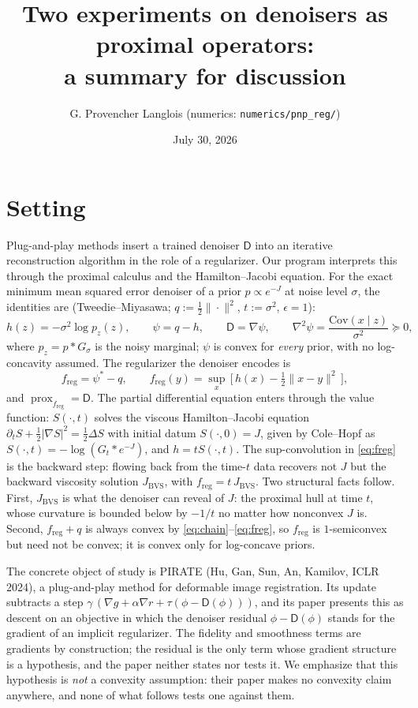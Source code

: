 \documentclass[11pt]{article}
\title{Two experiments on denoisers as proximal operators:\\ a summary for discussion}
\author{G. Provencher Langlois (numerics: \texttt{numerics/pnp\_reg/})}
\date{July 30, 2026}
\newcommand{\D}{\mathsf{D}}
\newcommand{\prox}{\operatorname{prox}}
\newcommand{\freg}{f_{\mathrm{reg}}}
\newcommand{\Jbvs}{J_{\mathrm{BVS}}}
\begin{document}
\maketitle

\section{Setting}

Plug-and-play methods insert a trained denoiser $\D$ into an iterative reconstruction algorithm in the role of a regularizer. Our program interprets this through the proximal calculus and the Hamilton--Jacobi equation. For the exact minimum mean squared error denoiser of a prior $p \propto e^{-J}$ at noise level $\sigma$, the identities are (Tweedie--Miyasawa; $q := \tfrac12\|\cdot\|^2$, $t := \sigma^2$, $\epsilon = 1$):
\begin{equation}
h(z) = -\sigma^2 \log p_z(z), \qquad \psi = q - h, \qquad \D = \nabla\psi, \qquad \nabla^2\psi = \frac{\mathrm{Cov}(x \mid z)}{\sigma^2} \succeq 0,
\label{eq:chain}
\end{equation}
where $p_z = p * G_{\sigma}$ is the noisy marginal; $\psi$ is convex for \emph{every} prior, with no log-concavity assumed. The regularizer the denoiser encodes is
\begin{equation}
\freg = \psi^* - q, \qquad \freg(y) = \sup_x\, \bigl[\, h(x) - \tfrac12\|x - y\|^2 \,\bigr],
\label{eq:freg}
\end{equation}
and $\prox_{\freg} = \D$. The partial differential equation enters through the value function: $S(\cdot, t)$ solves the viscous Hamilton--Jacobi equation $\partial_t S + \tfrac12|\nabla S|^2 = \tfrac12\Delta S$ with initial datum $S(\cdot, 0) = J$, given by Cole--Hopf as $S(\cdot,t) = -\log(G_t * e^{-J})$, and $h = tS(\cdot, t)$. The sup-convolution in \eqref{eq:freg} is the backward step: flowing back from the time-$t$ data recovers not $J$ but the backward viscosity solution $\Jbvs$, with $\freg = t\,\Jbvs$. Two structural facts follow. First, $\Jbvs$ is what the denoiser can reveal of $J$: the proximal hull at time $t$, whose curvature is bounded below by $-1/t$ no matter how nonconvex $J$ is. Second, $\freg + q$ is always convex by \eqref{eq:chain}--\eqref{eq:freg}, so $\freg$ is $1$-semiconvex but need not be convex; it is convex only for log-concave priors.

The concrete object of study is PIRATE (Hu, Gan, Sun, An, Kamilov, ICLR 2024), a plug-and-play method for deformable image registration. Its update subtracts a step $\gamma\,(\nabla g + \alpha \nabla r + \tau(\phi - \D(\phi)))$, and its paper presents this as descent on an objective in which the denoiser residual $\phi - \D(\phi)$ stands for the gradient of an implicit regularizer. The fidelity and smoothness terms are gradients by construction; the residual is the only term whose gradient structure is a hypothesis, and the paper neither states nor tests it. We emphasize that this hypothesis is \emph{not} a convexity assumption: their paper makes no convexity claim anywhere, and none of what follows tests one against them.
\end{document}
